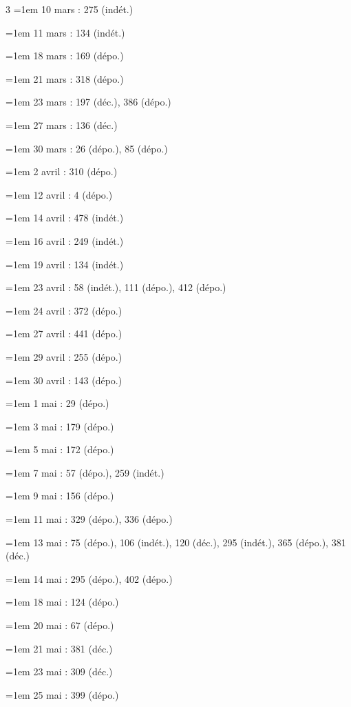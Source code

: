 \begin{multicols}{3}
\hangindent=1em 10 mars : 275 (indét.)\par
\hangindent=1em 11 mars : 134 (indét.)\par
\hangindent=1em 18 mars : 169 (dépo.)\par
\hangindent=1em 21 mars : 318 (dépo.)\par
\hangindent=1em 23 mars : 197 (déc.), 386 (dépo.)\par
\hangindent=1em 27 mars : 136 (déc.)\par
\hangindent=1em 30 mars : 26 (dépo.), 85 (dépo.)\par
\hangindent=1em 2 avril : 310 (dépo.)\par
\hangindent=1em 12 avril : 4 (dépo.)\par
\hangindent=1em 14 avril : 478 (indét.)\par
\hangindent=1em 16 avril : 249 (indét.)\par
\hangindent=1em 19 avril : 134 (indét.)\par
\hangindent=1em 23 avril : 58 (indét.), 111 (dépo.), 412 (dépo.)\par
\hangindent=1em 24 avril : 372 (dépo.)\par
\hangindent=1em 27 avril : 441 (dépo.)\par
\hangindent=1em 29 avril : 255 (dépo.)\par
\hangindent=1em 30 avril : 143 (dépo.)\par
\hangindent=1em 1 mai : 29 (dépo.)\par
\hangindent=1em 3 mai : 179 (dépo.)\par
\hangindent=1em 5 mai : 172 (dépo.)\par
\hangindent=1em 7 mai : 57 (dépo.), 259 (indét.)\par
\hangindent=1em 9 mai : 156 (dépo.)\par
\hangindent=1em 11 mai : 329 (dépo.), 336 (dépo.)\par
\hangindent=1em 13 mai : 75 (dépo.), 106 (indét.), 120 (déc.), 295 (indét.), 365 (dépo.), 381 (déc.)\par
\hangindent=1em 14 mai : 295 (dépo.), 402 (dépo.)\par
\hangindent=1em 18 mai : 124 (dépo.)\par
\hangindent=1em 20 mai : 67 (dépo.)\par
\hangindent=1em 21 mai : 381 (déc.)\par
\hangindent=1em 23 mai : 309 (déc.)\par
\hangindent=1em 25 mai : 399 (dépo.)\par

\end{multicols}
